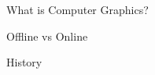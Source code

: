 \documentclass{lug}
\begin{document}
\begin{frame}{What is Computer Graphics?}
\begin{minipage}{.35\textwidth}
    \end{minipage}
\end{frame}

\begin{frame}{Offline vs Online}
\end{frame}

\begin{frame}{History}
\end{frame}
\end{document}
